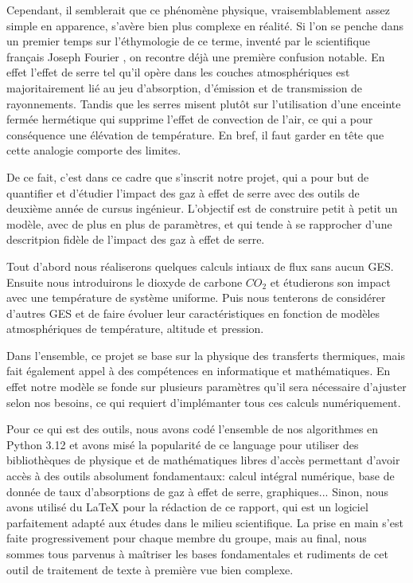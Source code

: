 \documentclass[a4paper, 12pt]{report} %
\begin{document}
\indent Cependant, il semblerait que ce phénomène physique, vraisemblablement assez simple 
en apparence, s'avère bien plus complexe en réalité. Si l'on se penche dans un premier temps sur 
l'éthymologie de ce terme, inventé par le scientifique français Joseph Fourier
,
on recontre déjà une première confusion notable. En effet l'effet de serre 
tel qu'il opère dans les couches atmosphériques est majoritairement lié au jeu d'absorption, d'émission 
et de transmission de rayonnements. Tandis que les serres misent plutôt sur l'utilisation d'une enceinte 
fermée hermétique qui supprime l'effet de convection de l'air, ce qui a pour conséquence une élévation 
de température. En bref, il faut garder en tête que cette analogie comporte des limites. \vspace{\baselineskip}

\indent De ce fait, c'est dans ce cadre que s'inscrit notre projet, qui a pour but de quantifier et d'étudier
l'impact des gaz à effet de serre avec des outils de deuxième année de cursus ingénieur. L'objectif est 
de construire petit à petit un modèle, avec de plus en plus de paramètres, et qui tende à se rapprocher
d'une descritpion fidèle de l'impact des gaz à effet de serre. \vspace{\baselineskip}

\indent Tout d'abord nous réaliserons quelques calculs intiaux de flux sans aucun GES.
Ensuite nous introduirons le dioxyde de carbone $CO_2$ et étudierons son impact avec une température de
système uniforme. Puis nous tenterons de considérer d'autres GES et de faire évoluer leur caractéristiques
en fonction de modèles atmosphériques de température, altitude et pression. \vspace{\baselineskip}

\indent Dans l'ensemble, ce projet se base sur la physique des transferts thermiques, 
mais fait également appel à des compétences en informatique et mathématiques.
En effet notre modèle se fonde sur plusieurs paramètres qu'il sera nécessaire
d'ajuster selon nos besoins, ce qui requiert d'implémanter tous ces calculs
numériquement. \vspace{\baselineskip}

\indent Pour ce qui est des outils, nous avons codé l'ensemble de nos algorithmes en Python 3.12 et avons misé
la popularité de ce language pour utiliser des bibliothèques de physique et de mathématiques libres d'accès
permettant d'avoir accès à des outils absolument fondamentaux: calcul intégral numérique, 
base de donnée de taux d'absorptions de gaz à effet de serre, graphiques... Sinon, nous avons utilisé du \LaTeX
pour la rédaction de ce rapport, qui est un logiciel parfaitement adapté aux études dans le milieu scientifique.
La prise en main s'est faite progressivement pour chaque membre du groupe, mais au final, nous sommes tous parvenus
à maîtriser les bases fondamentales et rudiments de cet outil de traitement de texte à première vue bien complexe.
\end{document}
